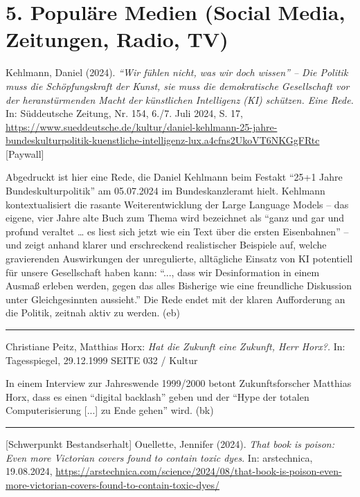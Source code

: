 \documentclass[a4paper,
fontsize=11pt,
oneside,
numbers=noperiodatend,
parskip=half-,
bibliography=totoc,
final
]{scrartcl}
\begin{document}
\hypertarget{populuxe4re-medien-social-media-zeitungen-radio-tv}{%
\section{5. Populäre Medien (Social Media, Zeitungen, Radio,
TV)}\label{populuxe4re-medien-social-media-zeitungen-radio-tv}}

Kehlmann, Daniel (2024). \emph{\enquote{Wir fühlen nicht, was wir doch
wissen} -- Die Politik muss die Schöpfungskraft der Kunst, sie muss die
demokratische Gesellschaft vor der heranstürmenden Macht der künstlichen
Intelligenz (KI) schützen. Eine Rede.} In: Süddeutsche Zeitung, Nr. 154,
6./7. Juli 2024, S. 17,
\url{https://www.sueddeutsche.de/kultur/daniel-kehlmann-25-jahre-bundeskulturpolitik-kuenstliche-intelligenz-lux.a4cfns2UkoVT6NKGgFRtc}
{[}Paywall{]}

Abgedruckt ist hier eine Rede, die Daniel Kehlmann beim Festakt
\enquote{25+1 Jahre Bundeskulturpolitik} am 05.07.2024 im
Bundeskanzleramt hielt. Kehlmann kontextualisiert die rasante
Weiterentwicklung der Large Language Models -- das eigene, vier Jahre
alte Buch zum Thema wird bezeichnet als \enquote{ganz und gar und
profund veraltet \ldots{} es liest sich jetzt wie ein Text über die
ersten Eisenbahnen} -- und zeigt anhand klarer und erschreckend
realistischer Beispiele auf, welche gravierenden Auswirkungen der
unregulierte, alltägliche Einsatz von KI potentiell für unsere
Gesellschaft haben kann: \enquote{..., dass wir Desinformation in einem
Ausmaß erleben werden, gegen das alles Bisherige wie eine freundliche
Diskussion unter Gleichgesinnten aussieht.} Die Rede endet mit der
klaren Aufforderung an die Politik, zeitnah aktiv zu werden. (eb)

\begin{center}\rule{0.5\linewidth}{0.5pt}\end{center}

Christiane Peitz, Matthias Horx: \emph{Hat die Zukunft eine Zukunft,
Herr Horx?.} In: Tagesspiegel, 29.12.1999 SEITE 032 / Kultur

In einem Interview zur Jahreswende 1999/2000 betont Zukunftsforscher
Matthias Horx, dass es einen \enquote{digital backlash} geben und der
\enquote{Hype der totalen Computerisierung {[}...{]} zu Ende gehen}
wird. (bk)

\begin{center}\rule{0.5\linewidth}{0.5pt}\end{center}

{[}Schwerpunkt Bestandserhalt{]} Ouellette, Jennifer (2024). \emph{That
book is poison: Even more Victorian covers found to contain toxic dyes}.
In: arstechnica, 19.08.2024,
\url{https://arstechnica.com/science/2024/08/that-book-is-poison-even-more-victorian-covers-found-to-contain-toxic-dyes/}
\end{document}

